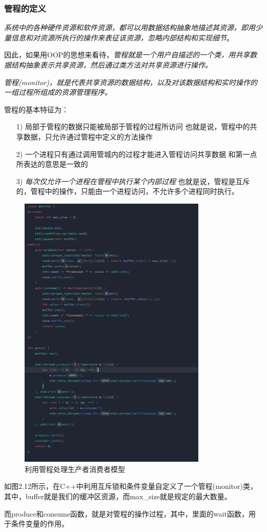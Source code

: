 \subsubsection{管程的定义}

    \emph{系统中的各种硬件资源和软件资源，都可以用数据结构抽象地描述其资源，\color{red}即用少量信息和对资源所执行的操作来表征该资源，忽略内部结构和实现细节}。

    因此，如果用OOP的思想来看待，\emph{管程就是一个用户自描述的一个类，用共享数据结构抽象表示共享资源，然后通过类方法对共享资源进行操作。}

    \emph{管程(monitor)，就是代表共享资源的数据结构，以及对该数据结构和实时操作的一组过程所组成的资源管理程序。}

    管程的基本特征为：

\begin{itemize}
    \item [1)] 局部于管程的数据只能被局部于管程的过程所访问
    \subitem 也就是说，管程中的共享数据，只允许通过管程中定义的方法操作
    \item [2)] 一个进程只有通过调用管城内的过程才能进入管程访问共享数据
    \subitem 和第一点所表达的意思是一致的
    \item [3)] \emph{\color{red}每次仅允许一个进程在管程中执行某个内部过程}
    \subitem 也就是说，管程是互斥的，管程中的操作，只能由一个进程访问，不允许多个进程同时执行。
\end{itemize}

\begin{figure}[!htbp]
    \centering
    \includegraphics[width=0.8\textwidth]{image/chapter02/利用管程处理生产者消费者模型.png}
    \caption{利用管程处理生产者消费者模型}
\end{figure}

    如图2.12所示，在C++中利用互斥锁和条件变量自定义了一个管程(monitor)类，其中，buffer就是我们的缓冲区资源，而max\_size就是规定的最大数量。

    而produce和consume函数，就是对管程的操作过程，其中，里面的wait函数，用于条件变量的作用。